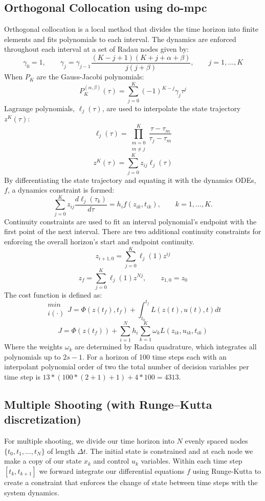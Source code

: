 \documentclass[]{article}
\begin{document}
\subsection*{Orthogonal Collocation using {do-mpc}} 
Orthogonal collocation is a local method that divides the time horizon into finite elements and fits polynomials to each interval. The dynamics are enforced throughout each interval at a set of Radau nodes given by:
        \[
        \gamma_0=1,  \qquad \gamma_j = \gamma_{j-1} \frac{(K-j+1)(K+j+\alpha+\beta)}{j(j+\beta)}, \qquad j = 1,\ldots,K
        \]
When $P_K$ are the Gauss-Jacobi polynomials:
        \[
        P_K^{(\alpha, \beta)}(\tau) = \sum_{j=0}^{K}(-1)^{K-j}\gamma_j\tau^j
        \]
Lagrange polynomials, $\ell_j(\tau)$, are used to interpolate the state trajectory $z^K(\tau)$:
        \[
	\ell_j(\tau)=\prod_{\substack{m=0 \\ m\neq j}}^{K}\frac{\tau-\tau_m}{\tau_j-\tau_m}
        \]        
        \[
	z^K(\tau)=\sum_{j=0}^{K}z_{ij}\ell_j(\tau)
        \]
By differentiating the state trajectory and equating it with the dynamics ODEs, $f$, a dynamics constraint is formed:
        \[
        \sum_{j=0}^K z_{ij}\frac{d\ell_j(\tau_k)}{d\tau}=h_if(z_{ik},t_{ik}), 
        \qquad k=1,\dots,K.
        \]
Continuity constraints are used to fit an interval polynomial's endpoint with the first point of the next interval. There are two additional continuity constraints for enforcing the overall horizon's start and endpoint continuity.
        \[
	z_{i+1,0}=\sum_{j=0}^{K}\ell_j(1)z^{ij}
        \]
        \[
	z_f=\sum_{j=0}^{K}\ell_j(1)z^{Nj}, \qquad z_{1,0} = z_0
        \]
        The cost function is defined as:
        \[
        	\substack{min \\ i(\cdot)}J=\Phi(z(t_f),t_f) + \int_{t_0}^{t_f}L(z(t),u(t),t)dt
        \]
        \[
        J=\Phi(z(t_f)) + \sum_{i=1}^{N}h_i\sum_{k=1}^{K}\omega_kL(z_{ik},u_{ik},t_{ik})
        \]
Where the weights $\omega_k$ are determined by Radau quadrature, which integrates all polynomials up to $2s-1$. For a horizon of 100 time steps each with an interpolant polynomial order of two the total number of decision variables per time step is $13*(100*(2+1)+1)+4*100=4313.$

\subsection*{Multiple Shooting (with Runge–Kutta discretization)}
For multiple shooting, we divide our time horizon into $N$ evenly spaced nodes $\{ t_0, t_1, \ldots, t_N \}$ of length $\Delta t$. The initial state is constrained and at each node we make a copy of our state $x_k$ and control $u_k$ variables. Within each time step $[ t_k, t_{k+1}]$ we forward integrate our differential equations $f$ using Runge-Kutta to create a constraint that enforces the change of state between time steps with the system dynamics. 
\end{document}
